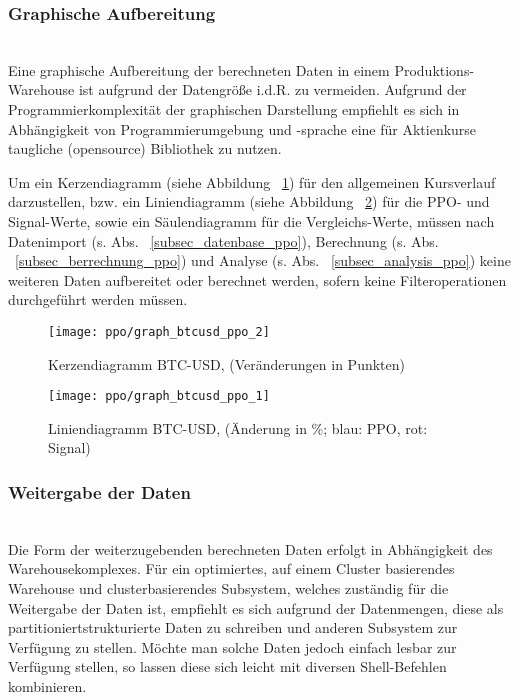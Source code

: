 \subsubsection{Graphische Aufbereitung\nopunct}~\\
Eine graphische Aufbereitung der berechneten Daten in einem Produktions-Warehouse ist aufgrund der Datengröße i.d.R. zu vermeiden. Aufgrund der Programmierkomplexität der graphischen Darstellung empfiehlt es sich in Abhängigkeit von Programmierumgebung und -sprache eine für Aktienkurse taugliche (opensource) Bibliothek zu nutzen. 

Um ein Kerzendiagramm (siehe Abbildung ~\ref{graph_btcusd_ppo_2}) für den allgemeinen Kursverlauf darzustellen, bzw. ein Liniendiagramm (siehe Abbildung ~\ref{graph_btcusd_ppo_1}) für die PPO- und Signal-Werte, sowie ein Säulendiagramm für die Vergleichs-Werte, müssen nach Datenimport (s. Abs. ~\ref{subsec_datenbase_ppo}), Berechnung (s. Abs. ~\ref{subsec_berrechnung_ppo}) und Analyse (s. Abs. ~\ref{subsec_analysis_ppo}) keine weiteren Daten aufbereitet oder berechnet werden, sofern keine Filteroperationen durchgeführt werden müssen.

\begin{figure}[!htb]
\texttt{[image: ppo/graph\_btcusd\_ppo\_2]}
\caption{Kerzendiagramm BTC-USD, (Veränderungen in Punkten)}
\label{graph_btcusd_ppo_2}
\end{figure}

\begin{figure}[!htb]
\texttt{[image: ppo/graph\_btcusd\_ppo\_1]}
\caption{Liniendiagramm BTC-USD, (Änderung in \%; blau: PPO, rot: Signal)}
\label{graph_btcusd_ppo_1}
\end{figure}

\subsubsection{Weitergabe der Daten\nopunct}~\\
Die Form der weiterzugebenden berechneten Daten erfolgt in Abhängigkeit des Warehousekomplexes. Für ein optimiertes, auf einem Cluster basierendes Warehouse und clusterbasierendes Subsystem, welches zuständig für die Weitergabe der Daten ist, empfiehlt es sich aufgrund der Datenmengen, diese als partitioniertstrukturierte Daten zu schreiben und anderen Subsystem zur Verfügung zu stellen. Möchte man solche Daten jedoch einfach lesbar zur Verfügung stellen, so lassen diese sich leicht mit diversen Shell-Befehlen kombinieren.

